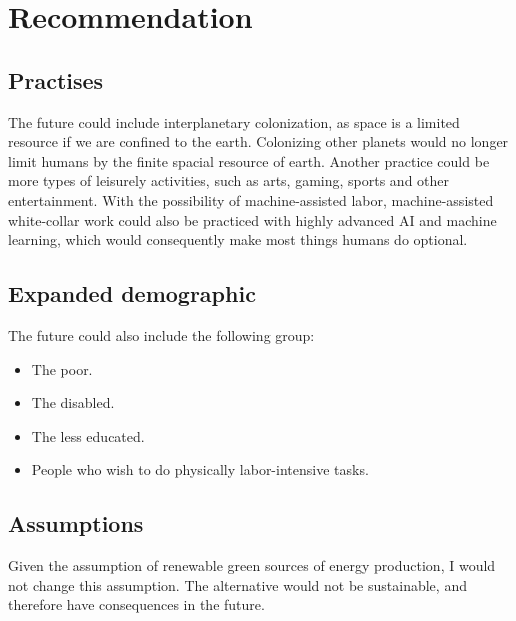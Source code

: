 \section{Recommendation}

\subsection{Practises}
The future could include interplanetary colonization, as space is a limited resource if we are confined to the earth.
Colonizing other planets would no longer limit humans by the finite spacial resource of earth.
Another practice could be more types of leisurely activities, such as arts, gaming, sports and other entertainment.
With the possibility of machine-assisted labor, machine-assisted white-collar work could also be practiced with highly advanced AI and machine learning, which would consequently make most things humans do optional.

\subsection{Expanded demographic}
The future could also include the following group:

\begin{itemize}
    \item The poor.
    \item The disabled.
    \item The less educated.
    \item People who wish to do physically labor-intensive tasks.
\end{itemize}

\subsection{Assumptions}
Given the assumption of renewable green sources of energy production, I would not change this assumption.
The alternative would not be sustainable, and therefore have consequences in the future.

